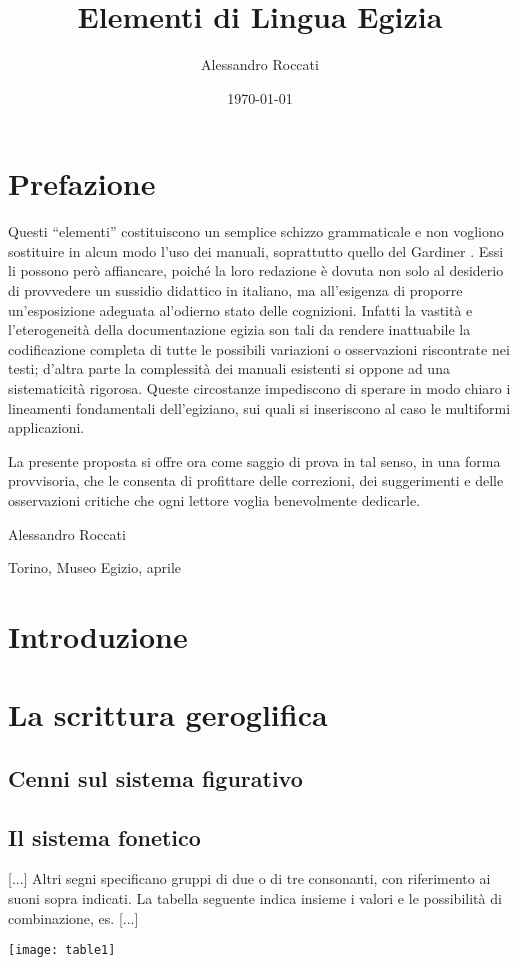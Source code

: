 \documentclass[11pt,a4paper]{amsart}
\author{Alessandro Roccati}
\title{Elementi di Lingua Egizia}
\date{\today}
\newcommand{\aeg}[2][\normalsize]{{#1\pmglyph{#2}}}
\begin{document}
\maketitle
\section*{Prefazione}
Questi ``elementi'' costituiscono un semplice schizzo grammaticale e non vogliono sostituire in alcun modo l'uso dei manuali, soprattutto quello del Gardiner \cite{gardiner1957egyptian}. Essi li possono però affiancare, poiché la loro redazione è dovuta non solo al desiderio di provvedere un sussidio didattico in italiano, ma all'esigenza di proporre un'esposizione adeguata al'odierno stato delle cognizioni. Infatti la vastità e l'eterogeneità della documentazione egizia son tali da rendere inattuabile la codificazione completa di tutte le possibili variazioni o osservazioni riscontrate nei testi; d'altra parte la complessità dei manuali esistenti si oppone ad una sistematicità rigorosa. Queste circostanze impediscono di sperare in modo chiaro i lineamenti fondamentali dell'egiziano, sui quali si inseriscono al caso le multiformi applicazioni.

La presente proposta si offre ora come saggio di prova in tal senso, in una forma provvisoria, che le consenta di profittare delle correzioni, dei suggerimenti e delle osservazioni critiche che ogni lettore voglia benevolmente dedicarle. 
\begin{flushright}
 Alessandro Roccati
\end{flushright}
Torino, Museo Egizio,  aprile 
\clearpage
\section{Introduzione}
\section{La scrittura geroglifica}
\subsection{Cenni sul sistema figurativo}
\subsection{Il sistema fonetico}
[...]
Altri segni specificano gruppi di due o di tre consonanti, con riferimento ai suoni sopra indicati. La tabella seguente indica insieme i valori e le possibilità di combinazione, es. \aeg[\tiny]{\HC:\Hn-\Hi-\Hm-\Hms-\Hs}
[...]
% 
\begin{table}[h!]
 \texttt{[image: table1]}
\end{table}
\end{document}
